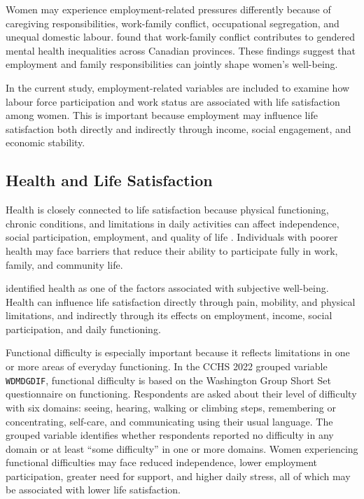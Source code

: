 \documentclass[12pt]{article}
\begin{document}
Women may experience employment-related pressures differently because of caregiving responsibilities, work-family conflict, occupational segregation, and unequal domestic labour. \citet{bilodeau2025} found that work-family conflict contributes to gendered mental health inequalities across Canadian provinces. These findings suggest that employment and family responsibilities can jointly shape women’s well-being.

In the current study, employment-related variables are included to examine how labour force participation and work status are associated with life satisfaction among women. This is important because employment may influence life satisfaction both directly and indirectly through income, social engagement, and economic stability.

\subsection{Health and Life Satisfaction}

Health is closely connected to life satisfaction because physical functioning, chronic conditions, and limitations in daily activities can affect independence, social participation, employment, and quality of life \citep{diener1984, denton2004}. Individuals with poorer health may face barriers that reduce their ability to participate fully in work, family, and community life.

\citet{diener1984} identified health as one of the factors associated with subjective well-being. Health can influence life satisfaction directly through pain, mobility, and physical limitations, and indirectly through its effects on employment, income, social participation, and daily functioning.

Functional difficulty is especially important because it reflects limitations in one or more areas of everyday functioning. In the CCHS 2022 grouped variable \texttt{WDMDGDIF}, functional difficulty is based on the Washington Group Short Set questionnaire on functioning. Respondents are asked about their level of difficulty with six domains: seeing, hearing, walking or climbing steps, remembering or concentrating, self-care, and communicating using their usual language. The grouped variable identifies whether respondents reported no difficulty in any domain or at least ``some difficulty'' in one or more domains. Women experiencing functional difficulties may face reduced independence, lower employment participation, greater need for support, and higher daily stress, all of which may be associated with lower life satisfaction.
\end{document}
